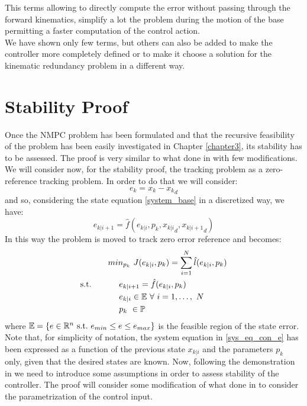 This terms allowing to directly compute the error without passing through the forward kinematics, simplify a lot the problem during the motion of the base permitting a faster computation of the control action.\\We have shown only few terms, but others can also be added to make the controller more completely defined or to make it choose a solution for the kinematic redundancy problem in a different way. 

\section{Stability Proof}\label{stabproof}

Once the NMPC problem has been formulated and that the recursive feasibility of the problem has been easily investigated in Chapter \ref{chapter3}, its stability has to be assessed. 
The proof is very similar to what done in \cite{alamir2018stability} with few modifications. We will consider now, for the stability proof, the tracking problem as a zero-reference tracking problem. In order to do that we will consider:
\begin{equation}
    e_k=x_k-{x_k}_d
\end{equation}
and so, considering the state equation \ref{system_base} in a discretized way, we have:
\begin{equation}\label{sys_eq_con_e}
    e_{k|i+1}=\hat{f}(e_{k|i},p_k,{x_{k|i}}_d,{x_{k|i+1}}_d)
\end{equation}
In this way the problem is moved to track zero error reference and becomes: 
\begin{equation} \label{ourproblem_stab}
\begin{split}
		& min_{{p}_k}\ J({e}_{k|i},{p}_k) =\sum_{i=1}^{N}\hat{l}(e_{k|i},{p}_{k}) \\
		\textnormal{s.t.}\qquad
		&\ \ \ \ e_{k|i+1}=\hat{f}(e_{k|i},p_k) \\
		&\ \ \ \ e_{k|i} \in \mathbb{E}\ \forall\ i=1,\dots,\ N  \\
		&\ \ \ \ {p}_k\   \in \mathbb{P}\ \\
	\end{split}	
\end{equation}
where $\mathbb{E} = \lbrace {e}\in \mathbb{R}^n\ \textnormal{s.t.}\ {e}_{min}\leq e\leq e_{max} \rbrace$ is the feasible region of the state error. Note that, for simplicity of notation, the system equation in \ref{sys_eq_con_e} has been expressed as a function of the previous state ${x_{k|i}}$ and the parameters $p_k$ only, given that the desired states are known.
Now, following the demonstration in \cite{alamir2018stability} we need to introduce some assumptions in order to assess stability of the controller. The proof will consider some modification of what done in \cite{alamir2018stability} to consider the parametrization of the control input. 


